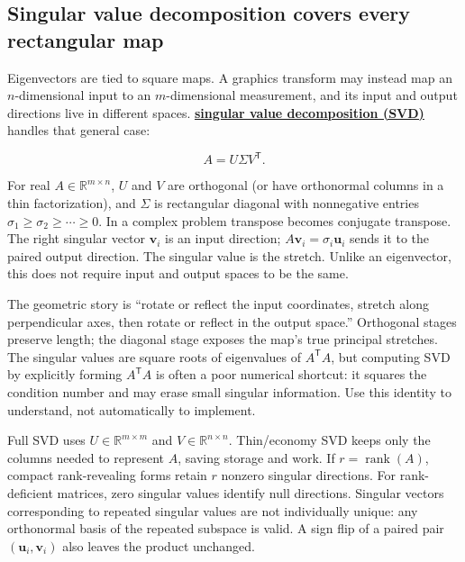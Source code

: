 \subsection{Singular value decomposition covers every rectangular map}\label{02-foundations-ii-ch024-singular-value-decomposition-covers-every-rectangular-map}

\hypertarget{02-foundations-ii-ch024-singular-value-decomposition-covers-every-rectangular-map}{}

Eigenvectors are tied to square maps. A graphics transform may instead map an \(n\)-dimensional input to an \(m\)-dimensional measurement, and its input and output directions live in different spaces. \textbf{\hyperref[02-foundations-ii-ch024-full-thin-and-compact-shapes-for-tall-and-wide-matrices]{singular value decomposition (SVD)}} handles that general case:

\[
A=U\Sigma V^\mathsf T.
\]

For real \(A\in\mathbb R^{m\times n}\), \(U\) and \(V\) are orthogonal (or have orthonormal columns in a thin factorization), and \(\Sigma\) is rectangular diagonal with nonnegative entries \(\sigma_1\ge\sigma_2\ge\cdots\ge0\). In a complex problem transpose becomes conjugate transpose. The right singular vector \(\mathbf v_i\) is an input direction; \(A\mathbf v_i=\sigma_i\mathbf u_i\) sends it to the paired output direction. The singular value is the stretch. Unlike an eigenvector, this does not require input and output spaces to be the same.

The geometric story is ``rotate or reflect the input coordinates, stretch along perpendicular axes, then rotate or reflect in the output space.'' Orthogonal stages preserve length; the diagonal stage exposes the map's true principal stretches. The singular values are square roots of eigenvalues of \(A^\mathsf T A\), but computing SVD by explicitly forming \(A^\mathsf T A\) is often a poor numerical shortcut: it squares the condition number and may erase small singular information. Use this identity to understand, not automatically to implement.

Full SVD uses \(U\in\mathbb R^{m\times m}\) and \(V\in\mathbb R^{n\times n}\). Thin/economy SVD keeps only the columns needed to represent \(A\), saving storage and work. If \(r=\operatorname{rank}(A)\), compact rank-revealing forms retain \(r\) nonzero singular directions. For rank-deficient matrices, zero singular values identify null directions. Singular vectors corresponding to repeated singular values are not individually unique: any orthonormal basis of the repeated subspace is valid. A sign flip of a paired pair \((\mathbf u_i,\mathbf v_i)\) also leaves the product unchanged.

